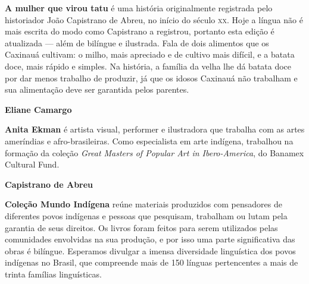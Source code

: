 \textbf{A mulher que virou tatu} é uma história originalmente registrada pelo historiador João Capistrano de Abreu, no início do século \textsc{xx}. Hoje a língua não é mais escrita do modo como Capistrano a registrou, portanto esta edição é atualizada --- além de bilíngue e ilustrada. Fala de dois alimentos que os Caxinauá cultivam: o milho, mais apreciado e de cultivo mais difícil, e a batata doce, mais rápido e simples. Na história, a família da velha lhe dá batata doce por dar menos trabalho de produzir, já que os idosos Caxinauá não trabalham e sua alimentação deve ser garantida pelos parentes.

\textbf{Eliane Camargo} \lipsum[2]

\textbf{Anita Ekman} é artista visual, performer e ilustradora que trabalha com as artes ameríndias e afro-brasileiras. Como especialista em arte indígena, trabalhou na formação da coleção \textit{Great Masters of Popular Art in Ibero-America}, do Banamex Cultural Fund.

\textbf{Capistrano de Abreu} \lipsum[2]

\textbf{Coleção Mundo Indígena} reúne materiais produzidos com pensadores de diferentes povos indígenas e pessoas que pesquisam, trabalham ou lutam pela garantia de seus direitos. Os livros foram feitos para serem utilizados pelas comunidades envolvidas na sua produção, e por isso uma parte significativa das obras é bilíngue. Esperamos divulgar a imensa diversidade linguística dos povos indígenas no Brasil, que compreende mais de 150 línguas pertencentes a mais de trinta famílias linguísticas.



